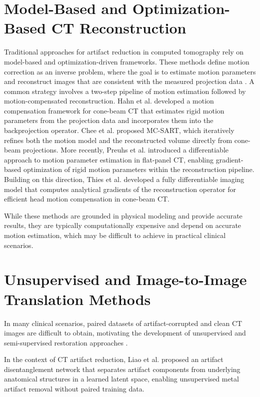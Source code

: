 \section{Model-Based and Optimization-Based CT Reconstruction}
Traditional approaches for artifact reduction in computed tomography rely on model-based and optimization-driven frameworks. These methods define motion correction as an inverse problem, where the goal is to estimate motion parameters and reconstruct images that are consistent with the measured projection data \cite{ritschl2011motion}.
A common strategy involves a two-step pipeline of motion estimation followed by motion-compensated reconstruction. Hahn et al. \cite{Hah+17}  developed a motion compensation framework for cone-beam CT that estimates rigid motion parameters from the projection data and incorporates them into the backprojection operator. Chee et al. \cite{Che2019} proposed MC-SART, which iteratively refines both the motion model and the reconstructed volume directly from cone-beam projections. More recently, Preuhs et al. \cite{Pre+20} introduced a differentiable approach to motion parameter estimation in flat-panel CT, enabling gradient-based optimization of rigid motion parameters within the reconstruction pipeline. Building on this direction, Thies et al. \cite{thies2025_cbctmotion} developed a fully differentiable imaging model that computes analytical gradients of the reconstruction operator for efficient head motion compensation in cone-beam CT.

While these methods are grounded in physical modeling and provide accurate results, they are typically computationally expensive and depend on accurate motion estimation, which may be difficult to achieve in practical clinical scenarios.


\section{Unsupervised and Image-to-Image Translation Methods  }

In many clinical scenarios, paired datasets of artifact-corrupted and clean CT images are difficult to obtain, motivating the development of unsupervised and semi-supervised restoration approaches \cite{zhu2017cyclegan}.  

In the context of CT artifact reduction, Liao et al. \cite{liao2019adn} proposed an artifact disentanglement network that separates artifact components from underlying anatomical structures in a learned latent space, enabling unsupervised metal artifact removal without paired training data.

